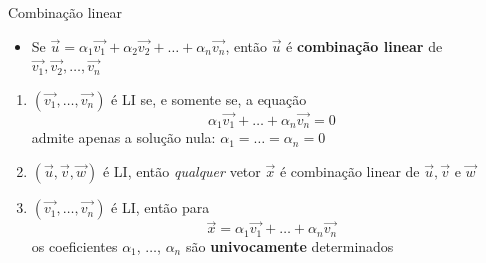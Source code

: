 \begin{frame}{Combinação linear}
    \begin{itemize}
        \item Se \(\vec{u}=\alpha_1 \vec{v_1} +\alpha_2 \vec{v_2} + \ldots +\alpha_n \vec{v_n}\), então
            \(\vec{u}\) é \textbf{combinação linear} de \(\vec{v_1}, \vec{v_2}, \ldots, \vec{v_n}\)
    \end{itemize}

   \vspace{0.5cm}
    \begin{tcolorbox}[colback=red!10, center title, title= \textit{Teoremas demonstrados no livro texto}]

        \begin{enumerate}
            \item \((\vec{v_1},\ldots,\vec{v_n})\) é LI se, e somente se, a equação
                \[
                    \alpha_1 \vec{v_1}+\ldots+\alpha_n \vec{v_n}=0
                \]
                admite apenas a solução nula: \(\alpha_1=\ldots=\alpha_n=0\)
            \item \((\vec{u}, \vec{v}, \vec{w})\) é LI, então \textit{qualquer} vetor \(\vec{x}\) é combinação linear de \(\vec{u}, \vec{v} \text{ e } \vec{w}\)
            \item \((\vec{v_1},\ldots, \vec{v_n})\) é LI, então para
                \[
                    \vec{x} = \alpha_1 \vec{v_1}+\ldots+\alpha_n \vec{v_n}
                \]
                os coeficientes \(\alpha_1\), \(\ldots\), \(\alpha_n\) são \textbf{univocamente} determinados
        \end{enumerate}
    \end{tcolorbox}
\end{frame}

